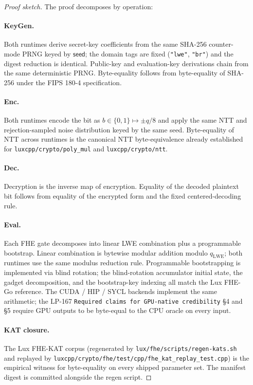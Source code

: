 \begin{proof}[Proof sketch]
The proof decomposes by operation:

\paragraph{KeyGen.} Both runtimes derive secret-key coefficients from the
same SHA-256 counter-mode PRNG keyed by $\mathsf{seed}$; the domain tags are
fixed (\texttt{"lwe"}, \texttt{"br"}) and the digest reduction is
identical. Public-key and evaluation-key derivations chain from the same
deterministic PRNG. Byte-equality follows from byte-equality of SHA-256
under the FIPS 180-4 specification.

\paragraph{Enc.} Both runtimes encode the bit as $b \in \{0, 1\} \mapsto
\pm q/8$ and apply the same NTT and rejection-sampled noise distribution
keyed by the same seed. Byte-equality of NTT across runtimes is the
canonical NTT byte-equivalence already established for
\texttt{luxcpp/crypto/poly\_mul} and \texttt{luxcpp/crypto/ntt}.

\paragraph{Dec.} Decryption is the inverse map of encryption. Equality of
the decoded plaintext bit follows from equality of the encrypted form and
the fixed centered-decoding rule.

\paragraph{Eval.} Each FHE gate decomposes into linear LWE combination plus
a programmable bootstrap. Linear combination is bytewise modular addition
modulo $q_{\mathrm{LWE}}$; both runtimes use the same modulus reduction
rule. Programmable bootstrapping is implemented via blind rotation; the
blind-rotation accumulator initial state, the gadget decomposition, and
the bootstrap-key indexing all match the Lux FHE-Go reference. The CUDA /
HIP / SYCL backends implement the same arithmetic; the LP-167
\texttt{Required claims for GPU-native credibility} \S 4 and \S 5 require
GPU outputs to be byte-equal to the CPU oracle on every input.

\paragraph{KAT closure.} The Lux FHE-KAT corpus (regenerated by
\texttt{lux/fhe/scripts/regen-kats.sh} and replayed by
\texttt{luxcpp/crypto/fhe/test/cpp/fhe\_kat\_replay\_test.cpp}) is the
empirical witness for byte-equality on every shipped parameter set. The
manifest digest is committed alongside the regen script.
\end{proof}

